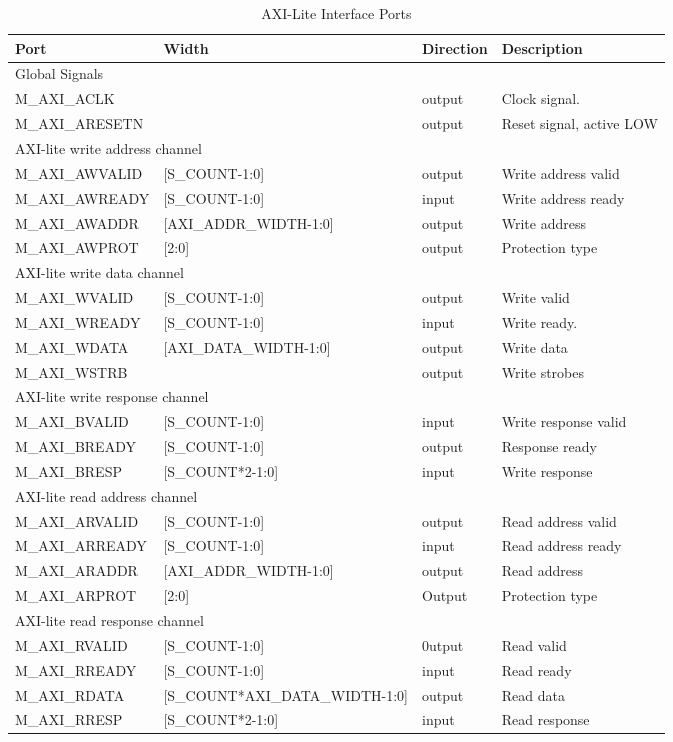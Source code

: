 \begin{table}[hbt]

\caption{AXI-Lite Interface Ports}
\begin{tabular}{|l|l|l|l|}
\toprule
Port  & Width & Direction & Description  \\
\midrule
	\hline \multicolumn{4}{l}{Global Signals}\\
	\hline M\_AXI\_ACLK & & output & Clock signal. \\
	\hline M\_AXI\_ARESETN&  & output & Reset signal, active LOW\\
	\hline \multicolumn{4}{l}{AXI-lite write address channel}\\
	\hline M\_AXI\_AWVALID&  [S\_COUNT-1:0] & output & Write address valid \\
	\hline M\_AXI\_AWREADY&  [S\_COUNT-1:0] & input & Write address ready\\
	\hline M\_AXI\_AWADDR&  [AXI\_ADDR\_WIDTH-1:0] & output &Write address \\
	\hline M\_AXI\_AWPROT&  [2:0] & output & Protection type\\
	\hline \multicolumn{4}{l}{AXI-lite write data channel}\\
	\hline M\_AXI\_WVALID&  [S\_COUNT-1:0] & output & Write valid \\
	\hline M\_AXI\_WREADY&  [S\_COUNT-1:0] & input & Write ready. \\
	\hline M\_AXI\_WDATA&  [AXI\_DATA\_WIDTH-1:0] & output & Write data\\
	\hline M\_AXI\_WSTRB&   & output & Write strobes\\
	\hline \multicolumn{4}{l}{AXI-lite write response channel}\\
	\hline M\_AXI\_BVALID&  [S\_COUNT-1:0]& input & Write response valid\\
	\hline M\_AXI\_BREADY&  [S\_COUNT-1:0] & output & Response ready\\
	\hline M\_AXI\_BRESP&  [S\_COUNT*2-1:0] & input & Write response \\
	\hline \multicolumn{4}{l}{AXI-lite read address channel}\\
	\hline M\_AXI\_ARVALID&  [S\_COUNT-1:0]& output & Read address valid\\
	\hline M\_AXI\_ARREADY&  [S\_COUNT-1:0] & input & Read address ready\\
	\hline M\_AXI\_ARADDR&  [AXI\_ADDR\_WIDTH-1:0] & output & Read address\\
	\hline M\_AXI\_ARPROT& [2:0] & Output & Protection type\\
	\hline \multicolumn{4}{l}{AXI-lite read response channel}\\
	\hline M\_AXI\_RVALID&  [S\_COUNT-1:0] & 0utput & Read valid\\
	\hline M\_AXI\_RREADY&  [S\_COUNT-1:0]& input & Read ready \\
	\hline M\_AXI\_RDATA&  [S\_COUNT*AXI\_DATA\_WIDTH-1:0] & output & Read data\\
	\hline M\_AXI\_RRESP&  [S\_COUNT*2-1:0]  & input & Read response\\


\end{tabular}
\end{table}
